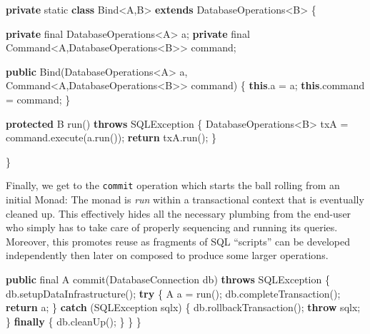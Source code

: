 \documentclass[11pt,]{article}
\newenvironment{Shaded}{}{}
\newcommand{\KeywordTok}[1]{\textcolor[rgb]{0.00,0.44,0.13}{\textbf{{#1}}}}
\newcommand{\DataTypeTok}[1]{\textcolor[rgb]{0.56,0.13,0.00}{{#1}}}
\newcommand{\FunctionTok}[1]{\textcolor[rgb]{0.02,0.16,0.49}{{#1}}}
\newcommand{\NormalTok}[1]{{#1}}
\begin{document}
\begin{Shaded}
\begin{Highlighting}[]
  \KeywordTok{private} \DataTypeTok{static} \KeywordTok{class} \NormalTok{Bind<A,B> }\KeywordTok{extends} \NormalTok{DatabaseOperations<B> \{}
    
    \KeywordTok{private} \DataTypeTok{final} \NormalTok{DatabaseOperations<A> a;}
    \KeywordTok{private} \DataTypeTok{final} \NormalTok{Command<A,DatabaseOperations<B>> command;}
    
    \KeywordTok{public} \FunctionTok{Bind}\NormalTok{(DatabaseOperations<A> a, Command<A,DatabaseOperations<B>> command) \{}
      \KeywordTok{this}\NormalTok{.}\FunctionTok{a} \NormalTok{= a;}
      \KeywordTok{this}\NormalTok{.}\FunctionTok{command} \NormalTok{= command;}
    \NormalTok{\}}
    
    \KeywordTok{protected} \NormalTok{B }\FunctionTok{run}\NormalTok{() }\KeywordTok{throws} \NormalTok{SQLException \{}
      \NormalTok{DatabaseOperations<B> txA = command.}\FunctionTok{execute}\NormalTok{(a.}\FunctionTok{run}\NormalTok{());}
      \KeywordTok{return} \NormalTok{txA.}\FunctionTok{run}\NormalTok{();}
    \NormalTok{\}}
    
  \NormalTok{\}}
\end{Highlighting}
\end{Shaded}

Finally, we get to the \texttt{commit} operation which starts the ball
rolling from an initial Monad: The monad is \emph{run} within a
transactional context that is eventually cleaned up. This effectively
hides all the necessary plumbing from the end-user who simply has to
take care of properly sequencing and running its queries. Moreover, this
promotes reuse as fragments of SQL ``scripts'' can be developed
independently then later on composed to produce some larger operations.

\begin{Shaded}
\begin{Highlighting}[]
  
  \KeywordTok{public} \DataTypeTok{final} \NormalTok{A }\FunctionTok{commit}\NormalTok{(DatabaseConnection db) }\KeywordTok{throws} \NormalTok{SQLException \{}
    \NormalTok{db.}\FunctionTok{setupDataInfrastructure}\NormalTok{();}
    \KeywordTok{try} \NormalTok{\{}
      \NormalTok{A a = }\FunctionTok{run}\NormalTok{();}
      \NormalTok{db.}\FunctionTok{completeTransaction}\NormalTok{();}
      \KeywordTok{return} \NormalTok{a;}
    \NormalTok{\} }\KeywordTok{catch} \NormalTok{(SQLException sqlx) \{}
      \NormalTok{db.}\FunctionTok{rollbackTransaction}\NormalTok{();}
      \KeywordTok{throw} \NormalTok{sqlx;}
    \NormalTok{\} }\KeywordTok{finally} \NormalTok{\{}
      \NormalTok{db.}\FunctionTok{cleanUp}\NormalTok{();}
    \NormalTok{\}}
  \NormalTok{\}}
\NormalTok{\}}
\end{Highlighting}
\end{Shaded}
\end{document}

